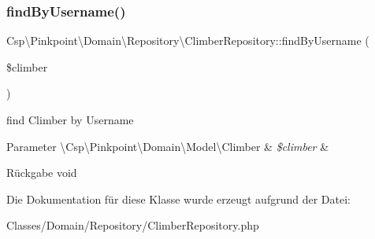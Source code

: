 \subsubsection{\texorpdfstring{find\+By\+Username()}{findByUsername()}}
{\footnotesize\ttfamily Csp\textbackslash{}\+Pinkpoint\textbackslash{}\+Domain\textbackslash{}\+Repository\textbackslash{}\+Climber\+Repository\+::find\+By\+Username (\begin{DoxyParamCaption}\item[{}]{\$climber }\end{DoxyParamCaption})}

find Climber by Username


\begin{DoxyParams}[1]{Parameter}
\textbackslash{}\+Csp\textbackslash{}\+Pinkpoint\textbackslash{}\+Domain\textbackslash{}\+Model\textbackslash{}\+Climber & {\em \$climber} & \\
\hline
\end{DoxyParams}
\begin{DoxyReturn}{Rückgabe}
void 
\end{DoxyReturn}


Die Dokumentation für diese Klasse wurde erzeugt aufgrund der Datei\+:\begin{DoxyCompactItemize}
\item 
Classes/\+Domain/\+Repository/Climber\+Repository.\+php\end{DoxyCompactItemize}
